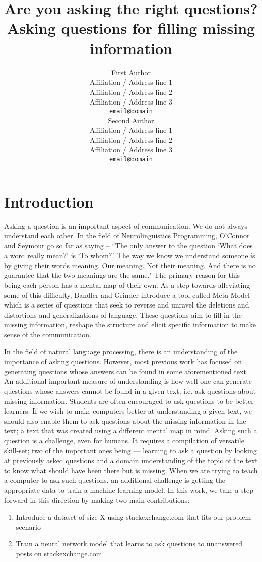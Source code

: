 \documentclass[11pt]{article}
\title{Are you asking the right questions? \\ Asking questions for filling missing information}
\author{First Author \\
  Affiliation / Address line 1 \\
  Affiliation / Address line 2 \\
  Affiliation / Address line 3 \\
  {\tt email@domain} \\\And
  Second Author \\
  Affiliation / Address line 1 \\
  Affiliation / Address line 2 \\
  Affiliation / Address line 3 \\
  {\tt email@domain} \\}
\date{}
\begin{document}
\maketitle
\begin{abstract}

\end{abstract}
\section{Introduction}

Asking a question is an important aspect of communication. We do not always understand each other. In the field of Neurolinguistics Programming, O'Connor and Seymour  go so far as saying -- ``The only answer to the question `What does a word really mean?' is `To whom?'. The way we know we understand someone is by giving their words meaning. Our meaning. Not their meaning. And there is no guarantee that the two meanings are the same." The primary reason for this being each person has a mental map of their own. As a step towards alleviating some of this difficulty, Bandler and Grinder  introduce a tool called Meta Model which is a series of questions that seek to reverse and unravel the deletions and distortions and generalizations of language. These questions aim to fill in the missing information, reshape the structure and elicit specific information to make sense of the communication.

In the field of natural language processing, there is an understanding of the importance of asking questions. However, most previous work has focused on generating questions whose answers can be found in some aforementioned text. An additional important measure of understanding is how well one can generate questions whose answers cannot be found in a given text; i.e. ask questions about missing information. Students are often encouraged to ask questions to be better learners. If we wish to make computers better at understanding a given text, we should also enable them to ask questions about the missing information in the text; a text that was created using a different mental map in mind. Asking such a question is a challenge, even for humans. It requires a compilation of versatile skill-set; two of the important ones being --- learning to ask a question by looking at previously asked questions and a domain understanding of the topic of the text to know what should have been there but is missing. When we are trying to teach a computer to ask such questions, an additional challenge is getting the appropriate data to train a machine learning model. In this work, we take a step forward in this direction by making two main contributions:
\begin{enumerate}
\item Introduce a dataset of size X using stackexchange.com that fits our problem scenario
\item Train a neural network model that learns to ask questions to unanswered posts on stackexchange.com
\end{enumerate}
    
\end{document}
